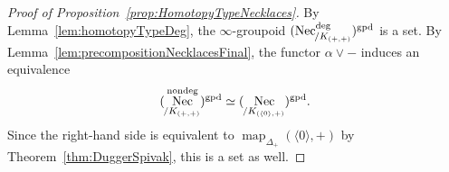 \documentclass[reqno]{amsart}
\numberwithin{equation}{subsection}
\theoremstyle{plain}
\theoremstyle{definition}
\DeclareMathOperator{\Map}{map}
\DeclareMathOperator{\Nec}{Nec}
\newcommand{\gp}{\mathrm{gpd}}
\newcommand{\ord}[1]{\langle#1\rangle}
\newcommand{\map}[1]{\Map_{#1}}
\newcommand{\Over}[2]{#1_{\hspace{-1pt}/#2}}
\begin{document}
\begin{proof}[{Proof of Proposition~\ref{prop:HomotopyTypeNecklaces}}]
	By Lemma~\ref{lem:homotopyTypeDeg}, the $\infty$-groupoid $(\Over{\Nec}{K_{(+,+)}}^{\mathrm{deg}})^\gp$ is a set. By Lemma~\ref{lem:precompositionNecklacesFinal}, the functor $\alpha\vee -$ induces an equivalence
	\begin{equation*}
	(\Over{\Nec}{K_{(+,+)}}^{\mathrm{nondeg}})^\gp\simeq(\Over{\Nec}{K_{(\ord{0},+)}})^\gp.
	\end{equation*}
	Since the right-hand side is equivalent to $\map{\Delta_+}(\ord{0},+)$ by Theorem~\ref{thm:DuggerSpivak}, this is a set as well.
\end{proof}




\end{document}
